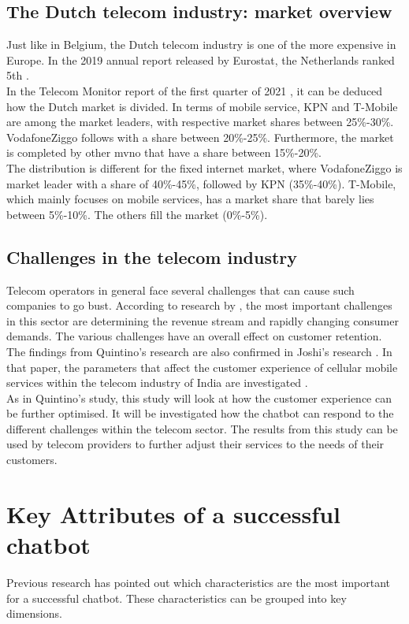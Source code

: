 \subsection{The Dutch telecom industry: market overview}
Just like in Belgium, the Dutch telecom industry is one of the more expensive in Europe. In the 2019 annual report released by Eurostat, the Netherlands ranked 5th \citep{Eurostat2020}.\\
In the Telecom Monitor report of the first quarter of 2021 \citep{Acm2021}, it can be deduced how the Dutch market is divided. In terms of mobile service, KPN and T-Mobile are among the market leaders, with respective market shares between 25\%-30\%. VodafoneZiggo follows with a share between 20\%-25\%. Furthermore, the market is completed by other \acrfull{mvno} that have a share between 15\%-20\%. \citep{Acm2021}\\
The distribution is different for the fixed internet market, where VodafoneZiggo is market leader with a share of 40\%-45\%, followed by KPN (35\%-40\%). T-Mobile, which mainly focuses on mobile services, has a market share that barely lies between 5\%-10\%. The others fill the market (0\%-5\%).\citep{Acm2021}

\subsection{Challenges in the telecom industry}
Telecom operators in general face several challenges that can cause such companies to go bust. According to research by \citeauthor{Quintino2019} \citep*{Quintino2019, Malviya2012}, the most important challenges in this sector are determining the revenue stream and rapidly changing consumer demands. The various challenges have an overall effect on customer retention. The findings from Quintino's research are also confirmed in Joshi's research \citep{Joshi2014}. In that paper, the parameters that affect the customer experience of cellular mobile services within the telecom industry of India are investigated \citep*{Joshi2014, Quintino2019, Malviya2012}.\\
As in Quintino's study, this study will look at how the customer experience can be further optimised. It will be investigated how the chatbot can respond to the different challenges within the telecom sector. The results from this study can be used by telecom providers to further adjust their services to the needs of their customers.

\section{Key Attributes of a successful chatbot}
Previous research \citep*{Muizzah2021, Verkeyn2018} has pointed out which characteristics are the most important for a successful chatbot. These characteristics can be grouped into key dimensions.

